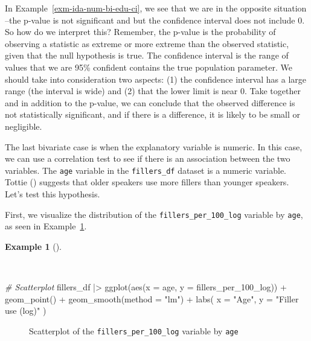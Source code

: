 \documentclass[
  letterpaper,
  DIV=11,
  numbers=noendperiod]{scrreprt}
\newenvironment{Shaded}{\begin{snugshade}}{\end{snugshade}}
\newcommand{\AttributeTok}[1]{\textcolor[rgb]{0.00,0.00,0.00}{#1}}
\newcommand{\CommentTok}[1]{\textcolor[rgb]{0.00,0.00,0.00}{\textit{#1}}}
\newcommand{\FunctionTok}[1]{\textcolor[rgb]{0.00,0.00,0.00}{#1}}
\newcommand{\NormalTok}[1]{\textcolor[rgb]{0.00,0.00,0.00}{#1}}
\newcommand{\SpecialCharTok}[1]{\textcolor[rgb]{0.00,0.00,0.00}{#1}}
\newcommand{\StringTok}[1]{\textcolor[rgb]{0.00,0.00,0.00}{#1}}
\theoremstyle{definition}
\newtheorem{example}{Example}[chapter]
\theoremstyle{remark}
\begin{document}
In Example~\ref{exm-ida-num-bi-edu-ci}, we see that we are in the
opposite situation --the p-value is not significant and but the
confidence interval does not include 0. So how do we interpret this?
Remember, the p-value is the probability of observing a statistic as
extreme or more extreme than the observed statistic, given that the null
hypothesis is true. The confidence interval is the range of values that
we are 95\% confident contains the true population parameter. We should
take into consideration two aspects: (1) the confidence interval has a
large range (the interval is wide) and (2) that the lower limit is near
0. Take together and in addition to the p-value, we can conclude that
the observed difference is not statistically significant, and if there
is a difference, it is likely to be small or negligible.

The last bivariate case is when the explanatory variable is numeric. In
this case, we can use a correlation test to see if there is an
association between the two variables. The \texttt{age} variable in the
\texttt{fillers\_df} dataset is a numeric variable. Tottie
() suggests that older speakers use more
fillers than younger speakers. Let's test this hypothesis.

First, we visualize the distribution of the
\texttt{fillers\_per\_100\_log} variable by \texttt{age}, as seen in
Example~\ref{exm-ida-num-bi-age-vis}.

\begin{example}[]\protect\hypertarget{exm-ida-num-bi-age-vis}{}\label{exm-ida-num-bi-age-vis}

~

\begin{Shaded}
\begin{Highlighting}[]
\CommentTok{\# Scatterplot}
\NormalTok{fillers\_df }\SpecialCharTok{|\textgreater{}}
  \FunctionTok{ggplot}\NormalTok{(}\FunctionTok{aes}\NormalTok{(}\AttributeTok{x =}\NormalTok{ age, }\AttributeTok{y =}\NormalTok{ fillers\_per\_100\_log)) }\SpecialCharTok{+}
  \FunctionTok{geom\_point}\NormalTok{() }\SpecialCharTok{+}
  \FunctionTok{geom\_smooth}\NormalTok{(}\AttributeTok{method =} \StringTok{"lm"}\NormalTok{) }\SpecialCharTok{+}
  \FunctionTok{labs}\NormalTok{(}
    \AttributeTok{x =} \StringTok{"Age"}\NormalTok{,}
    \AttributeTok{y =} \StringTok{"Filler use (log)"}
\NormalTok{  )}
\end{Highlighting}
\end{Shaded}

\begin{figure}[H]


\caption{\label{fig-ida-num-bi-age-vis}Scatterplot of the
\texttt{fillers\_per\_100\_log} variable by \texttt{age}}

\end{figure}%

\end{example}
\end{document}
